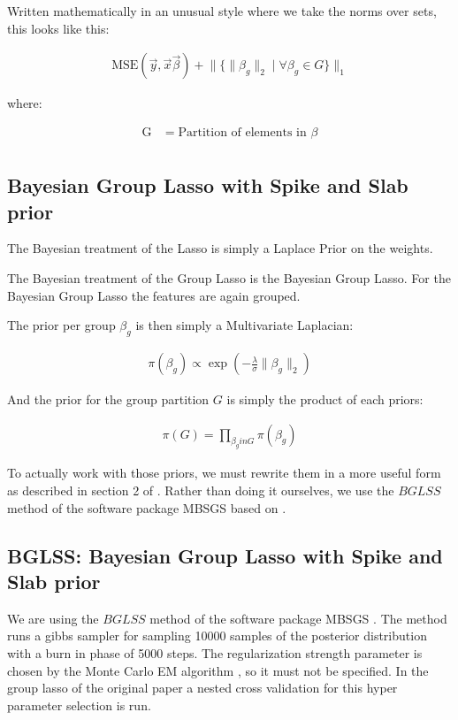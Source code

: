 \documentclass[twoside,twocolumn]{article}
\begin{document}
Written mathematically in an unusual style where we take the norms over sets, this looks like this:

\begin{align}
    \text{MSE}(\vec{y}, \vec{x}\vec{\beta}) + \lVert \{ \lVert \beta_g \rVert_2 \mid \forall{\beta_g \in G} \} \rVert_1
\end{align}

where:

\begin{align}
    \text{G} & = \text{Partition of elements in } \beta \\
\end{align}

\subsection{Bayesian Group Lasso with Spike and Slab prior}

The Bayesian treatment of the Lasso is simply a Laplace Prior on the weights.

The Bayesian treatment of the Group Lasso is the Bayesian Group Lasso.
For the Bayesian Group Lasso the features are again grouped.

The prior per group $\beta_g$ is then simply a Multivariate Laplacian:

\begin{align}
    \pi(\beta_g) \propto \exp(-\frac{\lambda}{\sigma} \lVert \beta_g \rVert_2)
\end{align}

And the prior for the group partition $G$ is simply the product of each priors:

\begin{align}
    \pi(G) = \prod_{\beta_g in G} \pi(\beta_g)
\end{align}

To actually work with those priors, we must rewrite them in a more useful form as described in section 2 of \cite{bayesian_group_lasso}.
Rather than doing it ourselves, we use the $BGLSS$ method of the software package MBSGS \cite{MBSGS} based on \cite{bayesian_group_lasso}.

\subsection{BGLSS: Bayesian Group Lasso with Spike and Slab prior}

We are using the $BGLSS$ method of the software package MBSGS \cite{MBSGS}.
The method runs a gibbs sampler for sampling 10000 samples of the posterior distribution with a burn in phase of 5000 steps.
The regularization strength parameter is chosen by the Monte Carlo EM algorithm \cite{casella_2001}, so it must not be specified.
In the group lasso of the original paper a nested cross validation for this hyper parameter selection is run.
\end{document}
